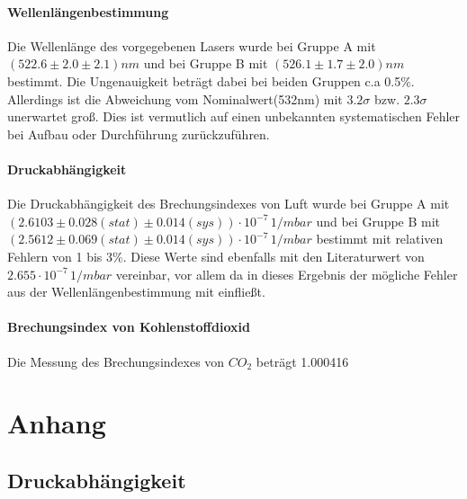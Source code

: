 \documentclass[12pt,a4paper]{article}
\begin{document}
\paragraph{Wellenlängenbestimmung}
Die Wellenlänge des vorgegebenen Lasers wurde bei Gruppe A mit $(522.6\pm 2.0 \pm 2.1) nm$ und bei Gruppe B mit $(526.1\pm 1.7\pm 2.0)nm$ bestimmt. Die Ungenauigkeit beträgt dabei bei beiden Gruppen c.a 0.5\%. Allerdings ist die Abweichung vom Nominalwert(532nm)
mit $3.2\sigma$ bzw. $2.3\sigma$ unerwartet groß. Dies ist vermutlich auf einen unbekannten systematischen Fehler bei Aufbau oder Durchführung zurückzuführen.
\paragraph{Druckabhängigkeit}
Die Druckabhängigkeit des Brechungsindexes von Luft wurde bei Gruppe A mit $(2.6103 \pm 0.028 (stat) \pm 0.014 (sys)) \cdot 10^{-7} \, \si{1/mbar}$ und bei Gruppe B mit $(2.5612 \pm 0.069 (stat) \pm 0.014 (sys)) \cdot 10^{-7} \, \si{1/mbar}$ bestimmt mit relativen Fehlern von 1 bis 3\%. Diese Werte sind ebenfalls mit den Literaturwert von $2.655\cdot 10^{-7} \, \si{1/mbar}$ vereinbar, vor allem da in dieses Ergebnis der mögliche Fehler aus der Wellenlängenbestimmung mit einfließt. 
\paragraph{Brechungsindex von Kohlenstoffdioxid}
Die Messung des Brechungsindexes von $CO_2$ beträgt 1.000416

\section{Anhang}

\subsection{Druckabhängigkeit}
\end{document}
